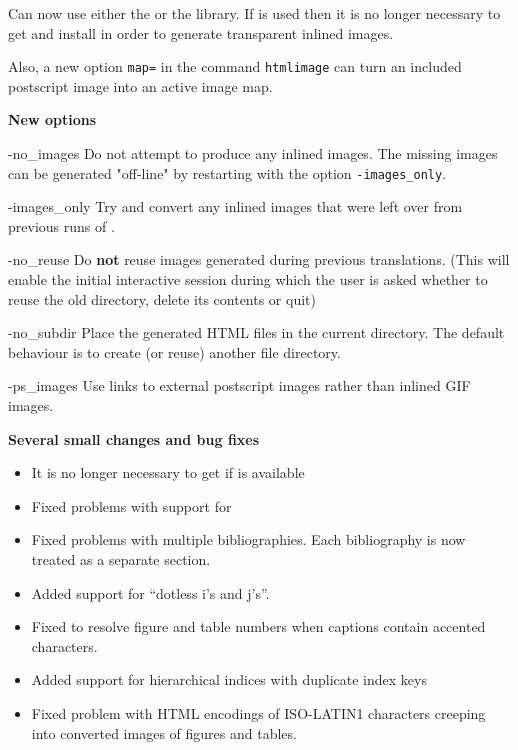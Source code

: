 \begin{htmllist}
Can now use either the  or the  library.
If  is used then it is no longer necessary to get and
install  in order to generate transparent inlined 
images.

Also, a new option \texttt{map=} in the 
command \texttt{htmlimage} can turn an included postscript image into an active
image map.

\item[\textbf{New options}] \hfill
\begin{htmllist}
\item [-no\_images]
Do not attempt to produce any inlined images. 
The missing images can be generated "off-line" by restarting \latextohtml{}
with the option \texttt{-images\_only}.
\item [-images\_only]
Try and convert any inlined images that were left over from previous
runs of \latextohtml. 
\item [-no\_reuse]
Do \textbf{not} reuse images generated during previous translations.
(This will enable the initial interactive session during which the user is
asked whether to reuse the old directory, delete its contents or quit)
\item [-no\_subdir]
Place the generated HTML files  in the 
current directory. The default behaviour is to create (or reuse)
another file directory.
\item [-ps\_images]
Use links to external postscript images rather than inlined GIF images.
\end{htmllist}
\item[\textbf{Several small changes and bug fixes}] \hfill
\begin{itemize}
\item It is no longer necessary to get  if 
is available
\item Fixed problems with support for 
\item Fixed problems with multiple bibliographies. Each bibliography
is now treated as a separate section.
\item Added support for ``dotless i's and j's''.
\item  Fixed to resolve figure and table numbers when captions contain
accented characters.
\item Added support for hierarchical indices with duplicate index keys
\item Fixed problem with HTML encodings of ISO-LATIN1 characters   
creeping into converted images of figures and tables.

\end{itemize}
\end{htmllist}
